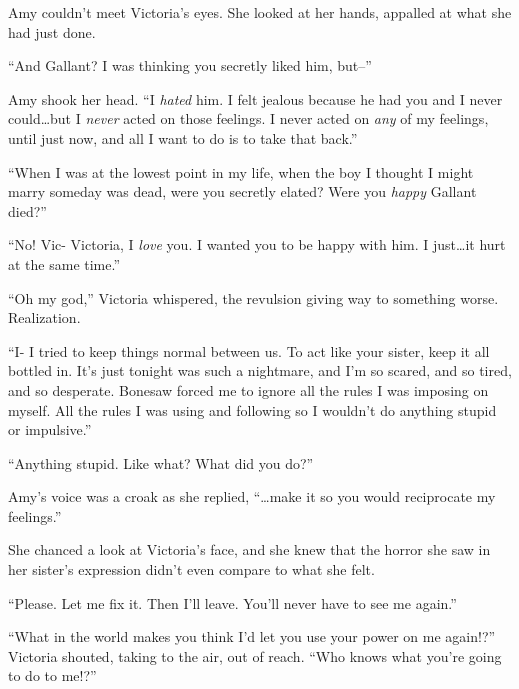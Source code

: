 Amy couldn't meet Victoria's eyes.  She looked at her hands, appalled at what she had just done.



``And Gallant?  I was thinking you secretly liked him, but--''



Amy shook her head.  ``I \emph{hated} him.  I felt jealous because he had you and I never could\ldots but I \emph{never} acted on those feelings.  I never acted on \emph{any} of my feelings, until just now, and all I want to do is to take that back.''



``When I was at the lowest point in my life, when the boy I thought I might marry someday was dead, were you secretly elated?  Were you \emph{happy} Gallant died?''



``No!  Vic- Victoria, I \emph{love} you.  I wanted you to be happy with him.  I just\ldots it hurt at the same time.''



``Oh my god,'' Victoria whispered, the revulsion giving way to something worse.  Realization.



``I- I tried to keep things normal between us.  To act like your sister, keep it all bottled in.  It's just tonight was such a nightmare, and I'm so scared, and so tired, and so desperate.  Bonesaw forced me to ignore all the rules I was imposing on myself.  All the rules I was using and following so I wouldn't do anything stupid or impulsive.''



``Anything stupid.  Like what?  What did you do?''



Amy's voice was a croak as she replied, ``\ldots{}make it so you would reciprocate my feelings.''



She chanced a look at Victoria's face, and she knew that the horror she saw in her sister's expression didn't even compare to what she felt.



``Please.  Let me fix it.  Then I'll leave.  You'll never have to see me again.''



``What in the world makes you think I'd let you use your power on me again!?''  Victoria shouted, taking to the air, out of reach.  ``Who knows what you're going to do to me!?''



